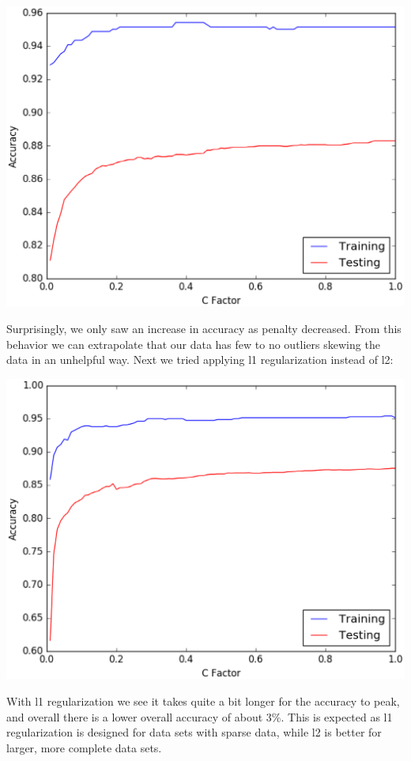 \documentclass{article} %
\begin{document}
 \includegraphics[scale=.5]{l2penalty}


 Surprisingly, we only saw an increase in accuracy as penalty decreased. From
 this behavior we can extrapolate that our data has few to no outliers skewing the
 data in an unhelpful way. Next we tried applying l1 regularization instead of l2:


 \includegraphics[scale=.5]{l1penalty}


 With l1 regularization we see it takes quite a bit longer for the accuracy to peak, and
 overall there is a lower overall accuracy of about 3\%. This is expected as l1
 regularization is designed for data sets with sparse data, while l2 is better for larger,
 more complete data sets.
\end{document}
